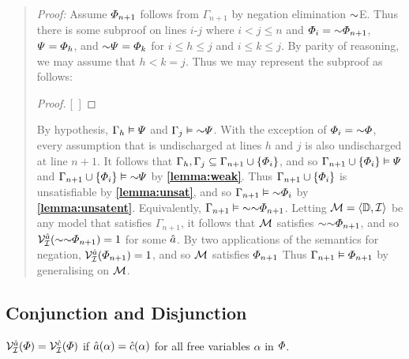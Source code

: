 \label{rule:NegE}

\begin{quote} 
  \textit{Proof:} Assume $\varPhi_{n+1}$ follows from $\Gamma_{n+1}$ by negation elimination $\enot$E.
  Thus there is some subproof on lines $i$-$j$ where $i<j\leq n$ and $\metaA_i=\enot\metaA_{n+1}$, $\varPsi=\varPhi_h$, and $\enot\metaB=\metaA_k$ for $i\leq h\leq j$ and $i\leq k\leq j$.
  By parity of reasoning, we may assume that $h<k=j$.
  Thus we may represent the subproof as follows:

  \begin{proof}
  \open
     
  \close
  [\ ]{\metaA} %
  \end{proof}

  By hypothesis, $\Gamma_h \vDash \varPsi$ and $\Gamma_j \models \enot\metaB$.
  With the exception of $\metaA_i=\enot\metaA$, every assumption that is undischarged at lines $h$ and $j$ is also undischarged at line $n+1$.
  It follows that $\Gamma_h,\Gamma_j\subseteq\Gamma_{n+1}\cup\lbrace\varPhi_i\rbrace$, and so $\Gamma_{n+1}\cup\lbrace\varPhi_i\rbrace \vDash \varPsi$ and $\Gamma_{n+1}\cup\set{\metaA_i} \models \enot\metaB$ by \textbf{\ref{lemma:weak}}.
  Thus $\Gamma_{n+1}\cup\lbrace\varPhi_i\rbrace$ is unsatisfiable by \textbf{\ref{lemma:unsat}}, and so $\Gamma_{n+1} \models \enot\metaA_i$ by \textbf{\ref{lemma:unsatent}}.
  Equivalently, $\Gamma_{n+1} \models \enot\enot\metaA_{n+1}$.
  Letting $\mathcal{M}=\langle\mathbb{D},\mathcal{I}\rangle$ be any model that satisfies $\Gamma_{n+1}$, it follows that $\mathcal{M}$ satisfies $\enot\enot\metaA_{n+1}$, and so $\VV{\I}{\va{a}}(\enot\enot\metaA_{n+1})=1$ for some $\hat{a}$. 
  By two applications of the semantics for negation, $\mathcal{V}_{\mathcal{I}}^{\hat{a}}(\varPhi_{n+1})=1$, and so $\mathcal{M}$ satisfies $\varPhi_{n+1}$
  Thus $\Gamma_{n+1} \vDash \varPhi_{n+1}$ by generalising on $\mathcal{M}$.
\end{quote}




\subsection{Conjunction and Disjunction}%
  \label{sub:ConjunctionDisjunction}

\begin{Lthm} \label{lemma:assign}
  $\mathcal{V}_{\mathcal{I}}^{\hat{a}}(\varPhi)=\mathcal{V}_{\mathcal{I}}^{\hat{c}}(\varPhi)$ if $\hat{a}(\alpha)=\hat{c}(\alpha)$ for all free variables $\alpha$ in $\varPhi$.
\end{Lthm}

